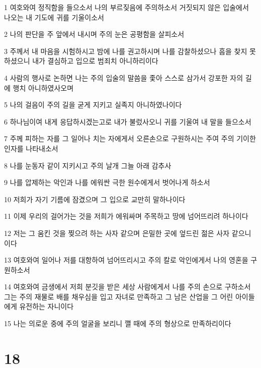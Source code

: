 \par 1 여호와여 정직함을 들으소서 나의 부르짖음에 주의하소서 거짓되지 않은 입술에서 나오는 내 기도에 귀를 기울이소서
\par 2 나의 판단을 주 앞에서 내시며 주의 눈은 공평함을 살피소서
\par 3 주께서 내 마음을 시험하시고 밤에 나를 권고하시며 나를 감찰하셨으나 흠을 찾지 못하셨으니 내가 결심하고 입으로 범죄치 아니하리이다
\par 4 사람의 행사로 논하면 나는 주의 입술의 말씀을 좇아 스스로 삼가서 강포한 자의 길에 행치 아니하였사오며
\par 5 나의 걸음이 주의 길을 굳게 지키고 실족지 아니하였나이다
\par 6 하나님이여 내게 응답하시겠는고로 내가 불렀사오니 귀를 기울여 내 말을 들으소서
\par 7 주께 피하는 자를 그 일어나 치는 자에게서 오른손으로 구원하시는 주여 주의 기이한 인자를 나타내소서
\par 8 나를 눈동자 같이 지키시고 주의 날개 그늘 아래 감추사
\par 9 나를 압제하는 악인과 나를 에워싼 극한 원수에게서 벗어나게 하소서
\par 10 저희가 자기 기름에 잠겼으며 그 입으로 교만히 말하나이다
\par 11 이제 우리의 걸어가는 것을 저희가 에워싸며 주목하고 땅에 넘어뜨리려 하나이다
\par 12 저는 그 움킨 것을 찢으려 하는 사자 같으며 은밀한 곳에 엎드린 젊은 사자 같으니이다
\par 13 여호와여 일어나 저를 대항하여 넘어뜨리시고 주의 칼로 악인에게서 나의 영혼을 구원하소서
\par 14 여호와여 금생에서 저희 분깃을 받은 세상 사람에게서 나를 주의 손으로 구하소서 그는 주의 재물로 배를 채우심을 입고 자녀로 만족하고 그 남은 산업을 그 어린 아이들에게 유전하는 자니이다
\par 15 나는 의로운 중에 주의 얼굴을 보리니 깰 때에 주의 형상으로 만족하리이다

\chapter{18}

